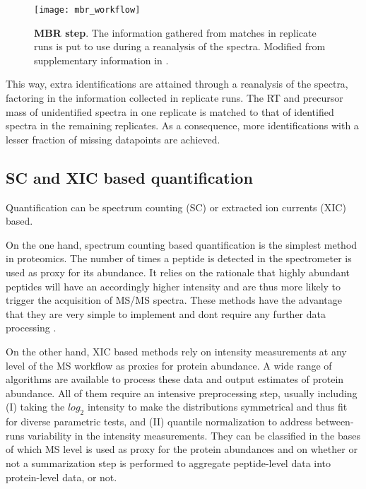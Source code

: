 \begin{figure}[!h]
\centering
\texttt{[image: mbr\_workflow]}
\caption[Match Between Runs module]{\textbf{\ac{MBR} step}. The information gathered from matches in replicate runs is put to use during a reanalysis of the spectra. Modified from supplementary information in \cite{Argentini2016}.}
\label{figure:moff_mbr}
\end{figure}

This way, extra identifications are attained through a reanalysis of the spectra, factoring in the information collected in replicate runs. The RT and precursor mass of unidentified spectra in one replicate is matched to that of identified spectra in the remaining replicates. As a consequence, more identifications with a lesser fraction of missing datapoints are achieved.


\subsection{SC and XIC based quantification}
\label{subsec:scvsxic}


Quantification can be spectrum counting (\ac{SC}) or extracted ion currents (\ac{XIC}) based.

On the one hand, spectrum counting based quantification is the simplest method in proteomics. The number of times a peptide is detected in the spectrometer is used as proxy for its abundance. It relies on the rationale that highly abundant peptides will have an accordingly higher intensity and are thus more likely to trigger the acquisition of MS/MS spectra. These methods have the advantage that they are very simple to implement and don\textquotesingle t require any further data processing \cite{Barsnes2008}.

On the other hand, \ac{XIC} based methods rely on intensity measurements at any level of the \ac{MS} workflow as proxies for protein abundance. A wide range of algorithms are available to process these data and output estimates of protein abundance. All of them require an intensive preprocessing step, usually including (I) taking the $log_2$ intensity to make the distributions symmetrical and thus fit for diverse parametric tests, and (II) quantile normalization to address between-runs variability in the intensity measurements. They can be classified in the bases of which MS level is used as proxy for the protein abundances and on whether or not a summarization step is performed to aggregate peptide-level data into protein-level data, or not. 



